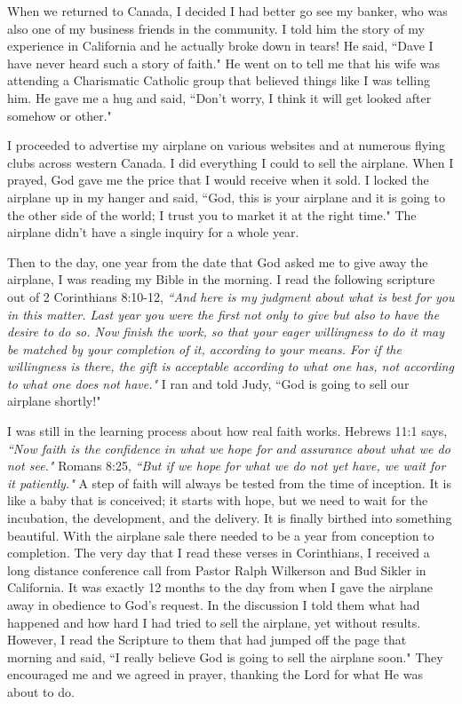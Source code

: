 \documentclass[oneside,12pt]{book}
\begin{document}
When we returned to Canada, I decided I had better go see my banker, who was also one of my business friends in the community. I told him the story of my experience in California and he actually broke down in tears! He said, ``Dave I have never heard such a story of faith." He went on to tell me that his wife was attending a Charismatic Catholic group that believed things like I was telling him. He gave me a hug and said, ``Don't worry, I think it will get looked after somehow or other."

I proceeded to advertise my airplane on various websites and at numerous flying clubs across western Canada. I did everything I could to sell the airplane. When I prayed, God gave me the price that I would receive when it sold. I locked the airplane up in my hanger and said, ``God, this is your airplane and it is going to the other side of the world; I trust you to market it at the right time." The airplane didn't have a single inquiry for a whole year. 

Then to the day, one year from the date that God asked me to give away the airplane, I was reading my Bible in the morning. I read the following scripture out of 2 Corinthians 8:10-12, \textit{``And here is my judgment about what is best for you in this matter. Last year you were the first not only to give but also to have the desire to do so. Now finish the work, so that your eager willingness to do it may be matched by your completion of it, according to your means. For if the willingness is there, the gift is acceptable according to what one has, not according to what one does not have."} I ran and told Judy, ``God is going to sell our airplane shortly!" 

I was still in the learning process about how real faith works. Hebrews 11:1 says, \textit{``Now faith is the confidence in what we hope for and assurance about what we do not see."} Romans 8:25, \textit{``But if we hope for what we do not yet have, we wait for it patiently."} A step of faith will always be tested from the time of inception. It is like a baby that is conceived; it starts with hope, but we need to wait for the incubation, the development, and the delivery. It is finally birthed into something beautiful. With the airplane sale there needed to be a year from conception to completion. The very day that I read these verses in Corinthians, I received a long distance conference call from Pastor Ralph Wilkerson and Bud Sikler in California. It was exactly 12 months to the day from when I gave the airplane away in obedience to God's request. In the discussion I told them what had happened and how hard I had tried to sell the airplane, yet without results. However, I read the Scripture to them that had jumped off the page that morning and said, ``I really believe God is going to sell the airplane soon." They encouraged me and we agreed in prayer, thanking the Lord for what He was about to do.
\end{document}
